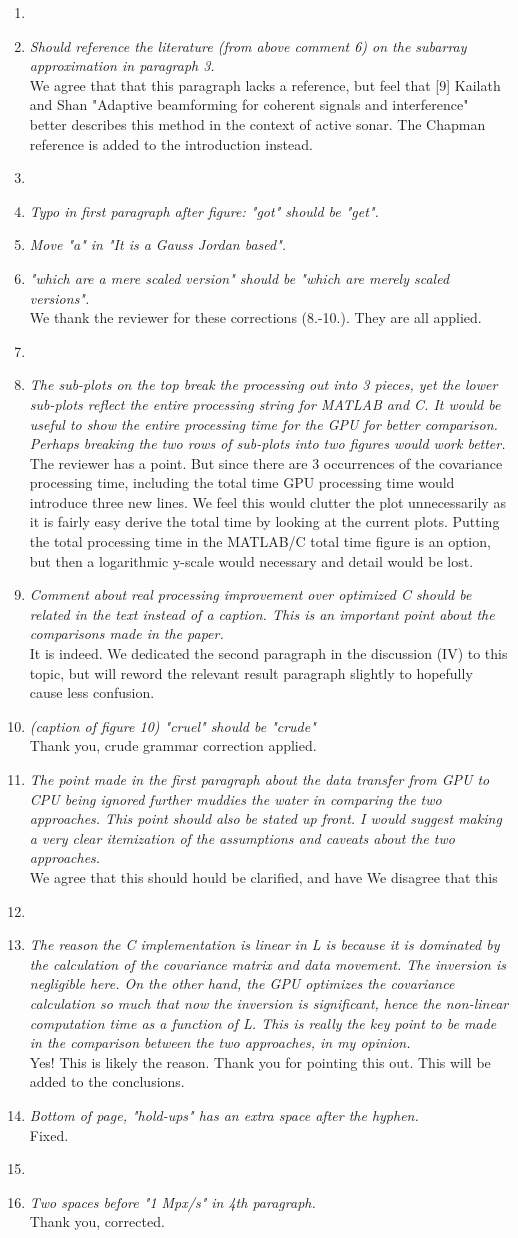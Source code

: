 \documentclass[11pt]{article} %
\newcommand\1{\vec 1}
\newcommand\q[1]{\textit{#1}}
\newcommand\qi[1]{\item\q{#1}}
\newcommand\hi[1]{\item[\textbf{#1}]}
\newcommand\ans[1]{#1}
\newcommand\ai[1]{\\[.5\baselineskip]\ans{#1}}
\begin{document}
\begin{enumerate}
%
\hi{Section II}
\qi{Should reference the literature (from above comment 6) on the subarray approximation in paragraph 3.}
\ai{We agree that that this paragraph lacks a reference, but feel that [9] Kailath and Shan "Adaptive beamforming for coherent signals and interference" better describes this method in the context of active sonar. The Chapman reference is added to the introduction instead.}
%
\hi{Section III (A-C)}
\qi{Typo in first paragraph after figure: "got" should be "get".}
\qi{Move "a" in "It is a Gauss Jordan based".}
\qi{"which are a mere scaled version" should be "which are merely scaled versions".}
\ai{We thank the reviewer for these corrections (8.-10.). They are all applied.}
%
\hi{Section IV}
\qi{The sub-plots on the top break the processing out into 3 pieces, yet the lower sub-plots reflect the entire processing string for MATLAB and C. It would be useful to show the entire processing time for the GPU for better comparison. Perhaps breaking the two rows of sub-plots into two figures would work better.}
\ai{The reviewer has a point. But since there are 3 occurrences of the covariance processing time, including the total time GPU processing time would introduce three new lines. We feel this would clutter the plot unnecessarily as it is fairly easy derive the total time by looking at the current plots. Putting the total processing time in the MATLAB/C total time figure is an option, but then a logarithmic y-scale would necessary and detail would be lost.}
%
\qi{Comment about real processing improvement over optimized C should be related in the text instead of a caption. This is an important point about the comparisons made in the paper.}
\ai{It is indeed. We dedicated the second paragraph in the discussion (IV) to this topic, but will reword the relevant result paragraph slightly to hopefully cause less confusion.}
%
\qi{(caption of figure 10) "cruel" should be "crude"}
\ai{Thank you, crude grammar correction applied.}
%
\qi{The point made in the first paragraph about the data transfer from GPU to CPU being ignored further muddies the water in comparing the two approaches. This point should also be stated up front. I would suggest making a very clear itemization of the assumptions and caveats about the two approaches.}
\ai{We agree that this should hould be clarified, and have We disagree that this }
%
\hi{Section V}
\qi{The reason the C implementation is linear in L is because it is dominated by the calculation of the covariance matrix and data movement. The inversion is negligible here. On the other hand, the GPU optimizes the covariance calculation so much that now the inversion is significant, hence the non-linear computation time as a function of L. This is really the key point to be made in the comparison between the two approaches, in my opinion.}
\ai{Yes! This is likely the reason. Thank you for pointing this out. This will be added to the conclusions.}
\qi{Bottom of page, "hold-ups" has an extra space after the hyphen.}
\ai{Fixed.}
\hi{Section V}
\qi{Two spaces before "1 Mpx/s" in 4th paragraph. }
\ai{Thank you, corrected.}
\end{enumerate}
\end{document}
